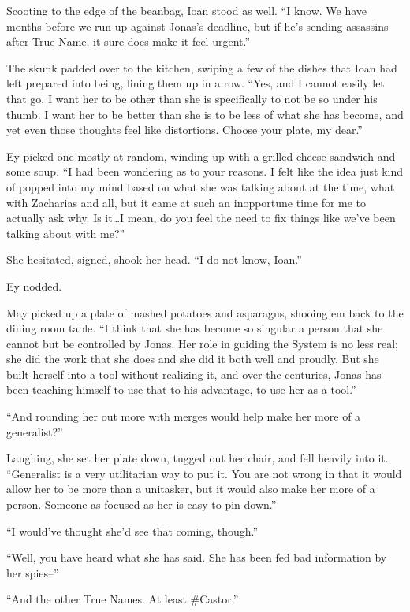 Scooting to the edge of the beanbag, Ioan stood as well. ``I know. We have months before we run up against Jonas's deadline, but if he's sending assassins after True Name, it sure does make it feel urgent.''

The skunk padded over to the kitchen, swiping a few of the dishes that Ioan had left prepared into being, lining them up in a row. ``Yes, and I cannot easily let that go. I want her to be other than she is specifically to not be so under his thumb. I want her to be better than she is to be less of what she has become, and yet even those thoughts feel like distortions. Choose your plate, my dear.''

Ey picked one mostly at random, winding up with a grilled cheese sandwich and some soup. ``I had been wondering as to your reasons. I felt like the idea just kind of popped into my mind based on what she was talking about at the time, what with Zacharias and all, but it came at such an inopportune time for me to actually ask why. Is it\ldots I mean, do you feel the need to fix things like we've been talking about with me?''

She hesitated, signed, shook her head. ``I do not know, Ioan.''

Ey nodded.

May picked up a plate of mashed potatoes and asparagus, shooing em back to the dining room table. ``I think that she has become so singular a person that she cannot but be controlled by Jonas. Her role in guiding the System is no less real; she did the work that she does and she did it both well and proudly. But she built herself into a tool without realizing it, and over the centuries, Jonas has been teaching himself to use that to his advantage, to use her as a tool.''

``And rounding her out more with merges would help make her more of a generalist?''

Laughing, she set her plate down, tugged out her chair, and fell heavily into it. ``Generalist is a very utilitarian way to put it. You are not wrong in that it would allow her to be more than a unitasker, but it would also make her more of a person. Someone as focused as her is easy to pin down.''

``I would've thought she'd see that coming, though.''

``Well, you have heard what she has said. She has been fed bad information by her spies--''

``And the other True Names. At least \#Castor.''

